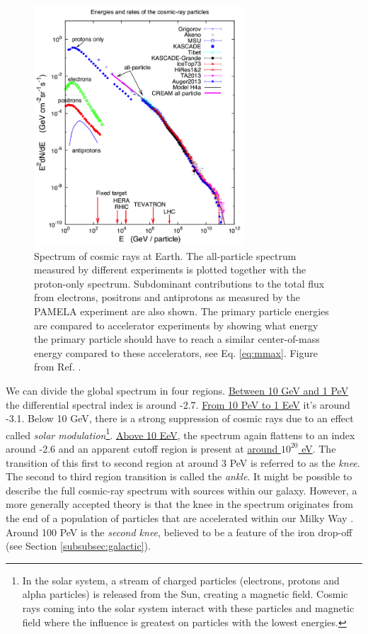 \begin{figure}
\centering
\includegraphics[width = 0.7\textwidth]{chapter3/img/spectrumCR.png}
\caption{Spectrum of cosmic rays at Earth. The all-particle spectrum measured by different experiments is plotted together with the proton-only spectrum. Subdominant contributions to the total flux from electrons, positrons and antiprotons as measured by the PAMELA experiment are also shown. The primary particle energies are compared to accelerator experiments by showing what energy the primary particle should have to reach a similar center-of-mass energy compared to these accelerators, see Eq. \ref{eq:mmax}. Figure from Ref. \cite{Blasi:2013rva}.}
\label{fig:spectrumCR}
\end{figure}

We can divide the global spectrum in four regions. \underline{Between 10 GeV and 1 PeV} the differential spectral index is around -2.7. \underline{From 10 PeV to 1 EeV} it's around -3.1. Below 10 GeV, there is a strong suppression of cosmic rays due to an effect called \textit{solar modulation}\footnote{In the solar system, a stream of charged particles (electrons, protons and alpha particles) is released from the Sun, creating a magnetic field. Cosmic rays coming into the solar system interact with these particles and magnetic field where the influence is greatest on particles with the lowest energies.}. \underline{Above 10 EeV}, the spectrum again flattens to an index around -2.6 and an apparent cutoff region is present at  \underline{around $10^{20}$ eV}. The transition of this first to second region at around 3 PeV is referred to as the \textit{knee}. The second to third region transition is called the \textit{ankle}. It might be possible to describe the full cosmic-ray spectrum with sources within our galaxy. However, a more generally accepted theory is that the knee in the spectrum originates from the end of a population of particles that are accelerated within our Milky Way \cite{Gaisser:2013bla}. Around 100 PeV is the \textit{second knee}, believed to be a feature of the iron drop-off (see Section \ref{subsubsec:galactic}).


